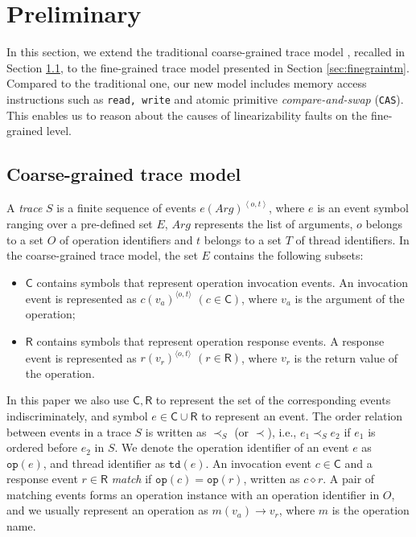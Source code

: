 \documentclass[runningheads]{llncs}
\newcommand{\ecall}{\mathsf{C}}
\newcommand{\eresp}{\mathsf{R}}
\begin{document}
\vspace{-0.8cm}

\section{Preliminary}\label{sec:fgtracemodel}


In this section, we extend the traditional coarse-grained trace model \cite{DBLP:conf/popl/BouajjaniEEH15}, recalled in Section \ref{sec:coarsegraintm}, to the fine-grained trace model presented in Section \ref{sec:finegraintm}. Compared to the traditional one, our new model includes memory access instructions such as \texttt{read, write} and atomic primitive \textit{compare-and-swap} (\texttt{CAS}). This enables us to reason about the causes of linearizability faults on the fine-grained level.

\subsection{Coarse-grained trace model}\label{sec:coarsegraintm}
A \textit{trace} $S$ is a finite sequence of events $e(\mathit{Arg})^{\left\langle o,t\right\rangle}$, where $e$ is an event symbol ranging over a pre-defined set $E$, $\mathit{Arg}$ represents the list of arguments, $o$ belongs to a set $O$ of operation identifiers and $t$ belongs to a set $T$ of thread identifiers. In the coarse-grained trace model, the set $E$ contains the following subsets:
\begin{itemize}
  \item $\ecall$ contains symbols that represent operation invocation events. An invocation event is represented as $c(v_a)^{\langle o,t\rangle}$ $(c\in \ecall)$, where $v_a$ is the argument of the operation;
  \item $\eresp$ contains symbols that represent operation response events. A response event is represented as $r(v_r)^{\langle o,t\rangle}$ $(r\in \eresp)$, where $v_r$ is the return value of the operation.
\end{itemize}
\noindent In this paper we also use $\ecall, \eresp$ to represent the set of the corresponding events indiscriminately, and symbol $e\in \ecall\cup \eresp$ to represent an event. The order relation between events in a trace $S$ is written as $\prec_S$ (or $\prec$), i.e., $e_1\prec_S e_2$ if $e_1$ is ordered before $e_2$ in $S$. We denote the operation identifier of an event $e$ as $\mathtt{op}(e)$, and thread identifier as $\mathtt{td}(e)$. An invocation event $c\in \ecall$ and a response event $r\in \eresp$ \textit{match} if $\mathtt{op}(c) = \mathtt{op}(r)$, written as $c\diamond r$. A pair of matching events forms an operation instance with an operation identifier in $O$, and we usually represent an operation as $m(v_a)\to v_r$, where $m$ is the operation name.
 
\end{document}
